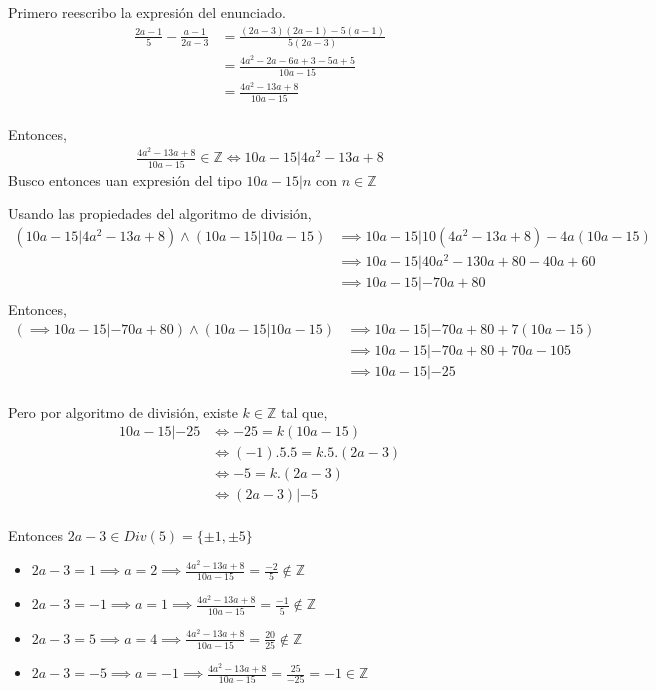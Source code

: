 Primero reescribo la expresión del enunciado.
\begin{align*}
    \frac{2a-1}{5} - \frac{a-1}{2a-3} &= \frac{(2a-3)(2a-1) - 5(a-1)}{5(2a-3)} \\
    &= \frac{4a^2-2a-6a+3-5a+5}{10a-15} \\
    &= \frac{4a^2 - 13a + 8}{10a-15} \\
\end{align*}

Entonces, 
\begin{align*}
    \frac{4a^2 - 13a + 8}{10a-15} \in \mathbb{Z} \iff 10a-15|4a^2-13a+8
\end{align*}
Busco entonces uan expresión del tipo $ 10a-15|n $ con $ n \in \mathbb{Z} $

Usando las propiedades del algoritmo de división,
\begin{align*}
    (10a-15|4a^2-13a+8) \wedge (10a-15|10a-15) &\implies 10a-15|10(4a^2-13a+8) - 4a(10a-15) \\
    &\implies 10a-15|40a^2-130a+80 - 40a+60 \\
    &\implies 10a-15|-70a+80 \\
\end{align*}
Entonces,
\begin{align*}
    (\implies 10a-15|-70a+80) \wedge (10a-15|10a-15) &\implies 10a-15|-70a+80 +7(10a-15) \\
    &\implies 10a-15|-70a+80 + 70a - 105 \\
    &\implies 10a-15|-25 \\
\end{align*}

Pero por algoritmo de división, existe $ k \in \mathbb{Z} $ tal que,
\begin{align*}
    10a-15|-25 &\iff -25 = k(10a-15) \\
    &\iff (-1).5.5 = k.5.(2a-3) \\
    &\iff -5 = k.(2a-3) \\
    &\iff (2a-3)|-5 \\
\end{align*}

Entonces $ 2a-3 \in Div(5) = \{ \pm 1, \pm 5 \} $
\begin{itemize}
    \item $ 2a-3 = 1 \implies a = 2 \implies \frac{4a^2-13a+8}{10a-15} = \frac{-2}{5} \not \in \mathbb{Z} $
    \item $ 2a-3 = -1 \implies a = 1 \implies \frac{4a^2-13a+8}{10a-15} = \frac{-1}{5} \not \in \mathbb{Z} $
    \item $ 2a-3 = 5 \implies a = 4 \implies \frac{4a^2-13a+8}{10a-15} = \frac{20}{25} \not \in \mathbb{Z} $
    \item $ 2a-3 = -5 \implies a = -1 \implies \frac{4a^2-13a+8}{10a-15} = \frac{25}{-25} = -1 \in \mathbb{Z} $
\end{itemize}

